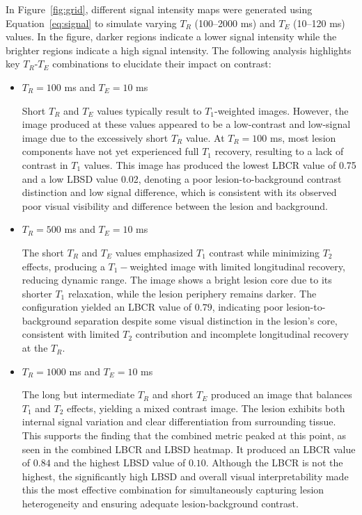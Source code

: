 \documentclass[10pt,a4paper,twoside]{article}
\begin{document}
In Figure~\ref{fig:grid}, different signal intensity maps were generated using Equation~\eqref{eq:signal} to simulate varying $T_R$ (100--2000 ms) and $T_E$ (10--120 ms) values. In the figure, darker regions indicate a lower signal intensity while the brighter regions indicate a high signal intensity. The following analysis highlights key \( T_R \)-\( T_E \) combinations to elucidate their impact on contrast:
\begin{itemize}
    \item $T_R=100$ ms and $T_E=10$ ms
    
Short $T_R$ and $T_E$ values typically result to $T_1$-weighted images. However, the image produced at these values appeared to be a low-contrast and low-signal image due to the excessively short $T_R$ value. At $T_R=100$ ms, most lesion components have not yet experienced full $T_1$ recovery, resulting to a lack of contrast in $T_1$ values. This image has produced the lowest LBCR value of 0.75 and a low LBSD value 0.02, denoting a poor lesion-to-background contrast distinction and low signal difference, which is consistent with its observed poor visual visibility and difference between the lesion and background.
    
    \item $T_R=500$ ms and $T_E=10$ ms 

The short $T_R$ and $T_E$ values emphasized $T_1$ contrast while minimizing $T_2$ effects, producing a $T_1-$weighted image with limited longitudinal recovery, reducing dynamic range. The image shows a bright lesion core due to its shorter $T_1$ relaxation, while the lesion periphery remains darker. The configuration yielded an LBCR value of $0.79$, indicating poor lesion-to-background separation despite some visual distinction in the lesion's core, consistent with limited $T_2$ contribution and incomplete longitudinal recovery at the $T_R$.

    \item  $T_R=1000$ ms and $T_E=10$ ms
    
The long but intermediate $T_R$ and short $T_E$ produced an image that balances $T_1$ and $T_2$ effects, yielding a mixed contrast image. The lesion exhibits both internal signal variation and clear differentiation from surrounding tissue. This supports the finding that the combined metric peaked at this point, as seen in the combined LBCR and LBSD heatmap. It produced an LBCR value of $0.84$ and the highest LBSD value of $0.10$. Although the LBCR is not the highest, the significantly high LBSD and overall visual interpretability made this the most effective combination for simultaneously capturing lesion heterogeneity and ensuring adequate lesion-background contrast.


\end{itemize}
\end{document}
